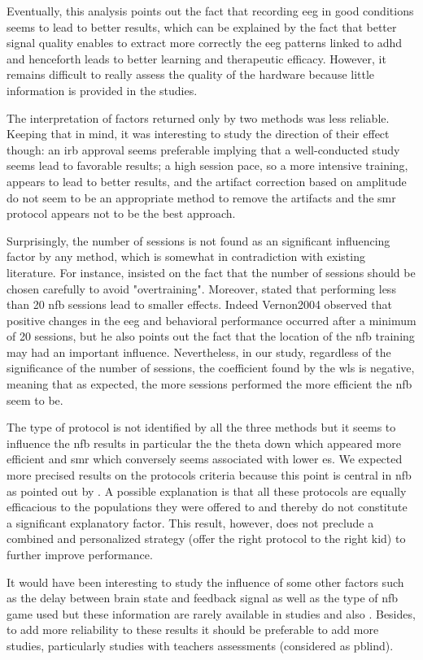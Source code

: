 Eventually, this analysis points out the fact that recording \gls{eeg} in good conditions seems to lead to better results, 
which can be explained by the fact that better signal quality enables to extract more correctly the \gls{eeg} 
patterns linked to \gls{adhd} and henceforth leads to better learning and therapeutic efficacy. However, it remains difficult to 
really assess the quality of the hardware because little information is provided in the studies.  

The interpretation of factors returned only by two methods was less reliable. Keeping that in mind, it was interesting 
to study the direction of their effect though: an \gls{irb} approval seems preferable implying that a well-conducted study 
seems lead to favorable results; a high session pace, so a more intensive training, appears to lead to better results,
and the artifact correction based on amplitude do not seem to be an appropriate method to remove the artifacts and the \gls{smr} protocol
appears not to be the best approach. 

Surprisingly, the number of sessions is not found as an significant influencing factor by any method, 
which is somewhat in contradiction with existing literature.
For instance, \citet{Enriquez2017} insisted on the fact that the number of sessions should be 
chosen carefully to avoid "overtraining". Moreover, \citet{Arns2014} stated that performing less than 20 \gls{nfb} sessions 
lead to smaller effects. Indeed {Vernon2004} observed that positive changes in the \gls{eeg} and behavioral 
performance occurred after a minimum of 20 sessions, but he also points out the fact that the
location of the \gls{nfb} training may had an important influence. 
Nevertheless, in our study, regardless of the significance of the number of sessions, the coefficient 
found by the \gls{wls} is negative, meaning that as expected,
the more sessions performed the more efficient the \gls{nfb} seem to be. 

The type of protocol is not identified by all the three methods but it seems to influence the \gls{nfb} results in particular the the theta down 
which appeared more efficient and \gls{smr} which conversely seems associated with lower \gls{es}. We expected 
more precised results on the protocols criteria because this point is central in \gls{nfb} as pointed out by \citet{Vernon2004}.
A possible explanation is that all these protocols are equally efficacious to the populations they were offered to and 
thereby do not constitute a significant explanatory factor. This result, however,
does not preclude a combined and personalized strategy (offer the right protocol to the right kid) to 
further improve performance. 

It would have been interesting to study the influence of some other factors such as the delay between brain state and feedback signal as well as the type of \gls{nfb} game used 
but these information are rarely available in studies and also . Besides, to add more reliability to these results it should be preferable to add more studies, 
particularly studies with teachers assessments (considered as \gls{pblind}). 

